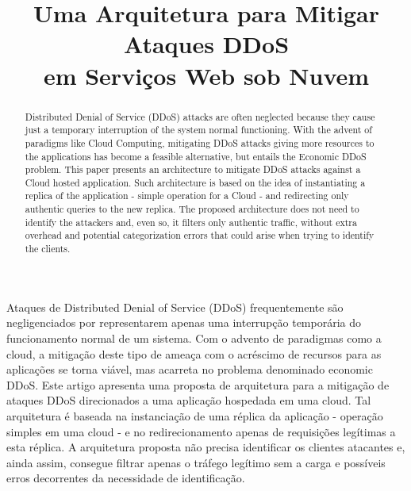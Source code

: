 \documentclass[a4paper, 12pt]{article}
\begin{document}
\title{Uma Arquitetura para Mitigar Ataques DDoS\\ em Serviços Web sob Nuvem}


\author{
}
   
\address{
}

\maketitle


\begin{abstract}
Distributed Denial of Service (DDoS) attacks are often neglected because they cause just a temporary interruption of the system normal functioning. With the advent of paradigms like Cloud Computing, mitigating DDoS attacks giving more resources to the applications has become a feasible alternative, but entails the Economic DDoS problem. This paper presents an architecture to mitigate DDoS attacks against a Cloud hosted application. Such architecture is based on the idea of instantiating a replica of the application - simple operation for a Cloud - and redirecting only authentic queries to the new replica. The proposed architecture does not need to identify the attackers and, even so, it filters only authentic traffic, without extra overhead and potential categorization errors that could arise when trying to identify the clients.
%
\end{abstract}

\begin{resumo}
Ataques de Distributed Denial of Service (DDoS) frequentemente são negligenciados por representarem apenas uma interrupção temporária do funcionamento normal de um sistema. Com o advento de paradigmas como a cloud, a mitigação deste tipo de ameaça com o acréscimo de recursos para as aplicações se torna viável, mas acarreta no problema denominado economic DDoS. Este artigo apresenta uma proposta de arquitetura para a mitigação de ataques DDoS direcionados a uma aplicação hospedada em uma cloud. Tal arquitetura é baseada na instanciação de uma réplica da aplicação - operação simples em uma cloud - e no redirecionamento apenas de requisições legítimas a esta réplica. A arquitetura proposta não precisa identificar os clientes atacantes e, ainda assim, consegue filtrar apenas o tráfego legítimo sem a carga e possíveis erros decorrentes da necessidade de identificação.
% 
\end{resumo}
\end{document}
